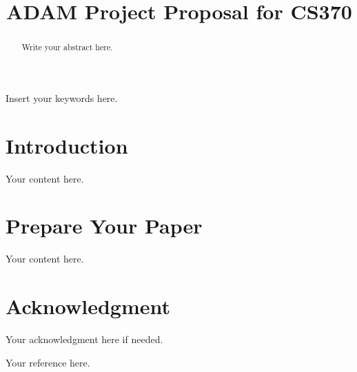 \documentclass[conference]{IEEEtran}
\begin{document}
\title{ADAM Project Proposal for CS370}

\author{
\and
{}
}


\maketitle

\begin{abstract}
Write your abstract here.
\end{abstract}

\begin{IEEEkeywords}
Insert your keywords here.
\end{IEEEkeywords}

\section{Introduction}
Your content here.

\section{Prepare Your Paper}
Your content here.

\section*{Acknowledgment}
Your acknowledgment here if needed.


\begin{thebibliography}{00}
 Your reference here.
\end{thebibliography}
\end{document}
